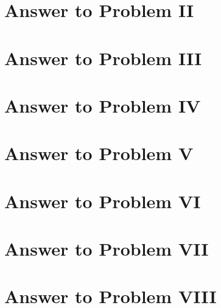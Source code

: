 \documentclass[11pt,a4paper]{article}
\begin{document}
\section{Answer to Problem II}\label{sec:P02} %



\clearpage
\section{Answer to Problem III}\label{sec:P03}



\clearpage
\section{Answer to Problem IV}\label{sec:P04}



\clearpage
\section{Answer to Problem V}\label{sec:P05}



\clearpage
\section{Answer to Problem VI}\label{sec:P06}



\clearpage
\section{Answer to Problem VII}\label{sec:P07}



\clearpage
\section{Answer to Problem VIII}\label{sec:P08} %
\end{document}
